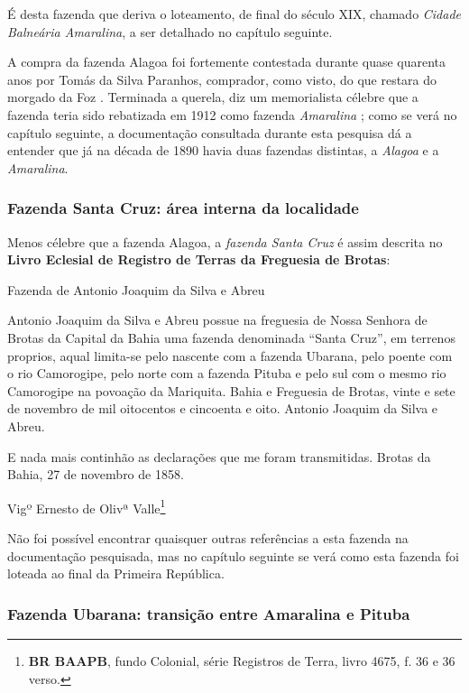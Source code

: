 É desta fazenda que deriva o loteamento, de final do século XIX, chamado \textit{Cidade Balneária Amaralina}, a ser detalhado no capítulo seguinte.

A compra da fazenda Alagoa foi fortemente contestada durante quase quarenta anos por Tomás da Silva Paranhos, comprador, como visto, do que restara do morgado da Foz \cite[p.~118]{campos_alagoa_1942}. Terminada a querela, diz um memorialista célebre que a fazenda teria sido rebatizada em 1912 como fazenda \textit{Amaralina} \cite[p.~118]{campos_alagoa_1942}; como se verá no capítulo seguinte, a documentação consultada durante esta pesquisa dá a entender que já na década de 1890 havia duas fazendas distintas, a \textit{Alagoa} e a \textit{Amaralina}.

\subsubsection{Fazenda Santa Cruz: área interna da localidade}

Menos célebre que a fazenda Alagoa, a \textit{fazenda Santa Cruz} é assim descrita no \textbf{Livro Eclesial de Registro de Terras da Freguesia de Brotas}:

\begin{citacao}
Fazenda de Antonio Joaquim da Silva e Abreu

Antonio Joaquim da Silva e Abreu possue na freguesia de Nossa Senhora de Brotas da Capital da Bahia uma fazenda denominada ``Santa Cruz'', em terrenos proprios, aqual limita-se pelo nascente com a fazenda Ubarana, pelo poente com o rio Camorogipe, pelo norte com a fazenda Pituba e pelo sul com o mesmo rio Camorogipe na povoação da Mariquita. Bahia e Freguesia de Brotas, vinte e sete de novembro de mil oitocentos e cincoenta e oito. Antonio Joaquim da Silva e Abreu.

E nada mais continhão as declarações que me foram transmitidas. Brotas da Bahia, 27 de novembro de 1858.

Vigº Ernesto de Olivª Valle\footnote{\textbf{BR BAAPB}, fundo Colonial, série Registros de Terra, livro 4675, f. 36 e 36 verso.}
\end{citacao}

Não foi possível encontrar quaisquer outras referências a esta fazenda na documentação pesquisada, mas no capítulo seguinte se verá como esta fazenda foi loteada ao final da Primeira República.

\subsubsection{Fazenda Ubarana: transição entre Amaralina e Pituba}


